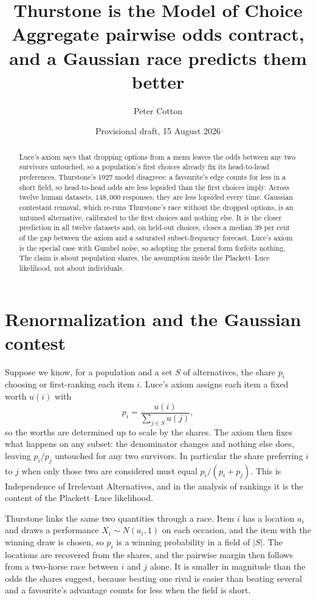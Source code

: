 \documentclass[11pt]{article}
\title{\textbf{Thurstone is the Model of Choice}\\[4pt]
\large\normalfont Aggregate pairwise odds contract, and a Gaussian race predicts them better}
\author{Peter Cotton}
\date{Provisional draft, 15 August 2026}
\begin{document}
\maketitle

\begin{abstract}
\noindent Luce's axiom says that dropping options from a menu leaves the odds
between any two survivors untouched, so a population's first choices already fix its
head-to-head preferences. Thurstone's 1927 model disagrees: a favourite's edge
counts for less in a short field, so head-to-head odds are less lopsided than the
first choices imply. Across twelve human datasets, $148{,}000$ responses, they are
less lopsided every time. Gaussian contestant removal, which re-runs Thurstone's
race without the dropped options, is an untuned alternative, calibrated to the first
choices and nothing else. It is the closer prediction in all twelve datasets and, on
held-out choices, closes a median $39$ per cent of the gap between the axiom and a
saturated subset-frequency forecast. Luce's axiom is the special case with Gumbel
noise, so adopting the general form forfeits nothing. The claim is about population
shares, the assumption inside the Plackett--Luce likelihood, not about individuals.
\end{abstract}

\section{Renormalization and the Gaussian contest}

Suppose we know, for a population and a set $S$ of alternatives, the share $p_i$
choosing or first-ranking each item $i$. Luce's axiom \cite{luce1959} assigns each
item a fixed worth $u(i)$ with
\begin{equation}
p_i = \frac{u(i)}{\sum_{j \in S} u(j)},
\label{eq:luce}
\end{equation}
so the worths are determined up to scale by the shares. The axiom then fixes what
happens on any subset: the denominator changes and nothing else does, leaving
$p_i/p_j$ untouched for any two survivors. In particular the share preferring $i$
to $j$ when only those two are considered must equal $p_i/(p_i+p_j)$. This is
Independence of Irrelevant Alternatives, and in the analysis of rankings it is the
content of the Plackett--Luce likelihood.

Thurstone \cite{thurstone1927} links the same two quantities through a race. Item
$i$ has a location $a_i$ and draws a performance $X_i \sim N(a_i,1)$ on each
occasion, and the item with the winning draw is chosen, so $p_i$ is a winning
probability in a field of $|S|$. The locations are recovered from the shares, and
the pairwise margin then follows from a two-horse race between $i$ and $j$ alone.
It is smaller in magnitude than the odds the shares suggest, because beating one
rival is easier than beating several and a favourite's advantage counts for less
when the field is short.
\end{document}
